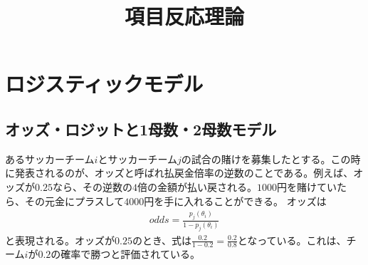 \documentclass[12pt]{jarticle}
\title{項目反応理論}
\begin{document}
\maketitle
\section{ロジスティックモデル}
\subsection{オッズ・ロジットと1母数・2母数モデル}
あるサッカーチーム$i$とサッカーチーム$j$の試合の賭けを募集したとする。この時に発表されるのが、オッズと呼ばれ払戻金倍率の逆数のことである。例えば、オッズが$0.25$なら、その逆数の$4$倍の金額が払い戻される。$1000$円を賭けていたら、その元金にプラスして$4000$円を手に入れることができる。
オッズは
\begin{eqnarray}
  \label{00}
  \displaystyle odds = \frac{p_j(\theta_i)}{1 - p_j(\theta_i)}
\end{eqnarray}
と表現される。オッズが$0.25$のとき、式は$\displaystyle \frac{0.2}{1 - 0.2} =\frac{0.2}{0.8}$となっている。これは、チーム$i$が$0.2$の確率で勝つと評価されている。
\end{document}
